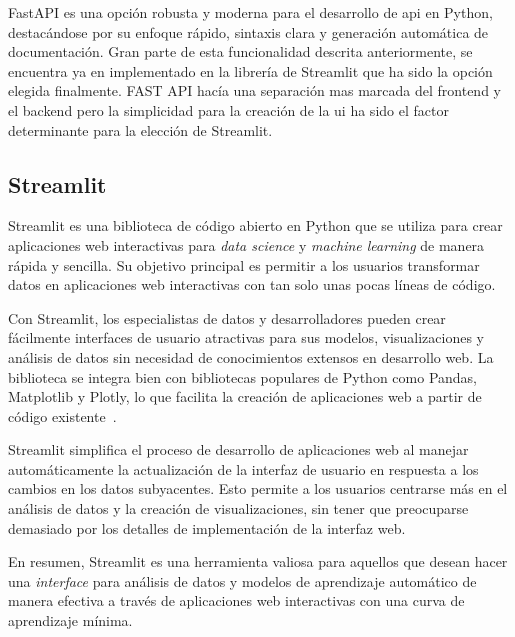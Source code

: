 FastAPI es una opción robusta y moderna para el desarrollo de \acrshort{api} en Python, destacándose por su enfoque rápido, sintaxis clara y generación automática de documentación. Gran parte de esta funcionalidad descrita anteriormente, se encuentra ya en implementado en la librería de Streamlit que ha sido la opción elegida finalmente. FAST API hacía una separación mas marcada del frontend y el backend pero la simplicidad para la creación de la \acrshort{ui} ha sido el factor determinante para la elección de Streamlit.

\subsection{Streamlit}

Streamlit es una biblioteca de código abierto en Python que se utiliza para crear aplicaciones web interactivas para \textit{data science} y \textit{machine learning} de manera rápida y sencilla. Su objetivo principal es permitir a los usuarios transformar datos en aplicaciones web interactivas con tan solo unas pocas líneas de código.

Con Streamlit, los especialistas de datos y desarrolladores pueden crear fácilmente interfaces de usuario atractivas para sus modelos, visualizaciones y análisis de datos sin necesidad de conocimientos extensos en desarrollo web. La biblioteca se integra bien con bibliotecas populares de Python como Pandas, Matplotlib y Plotly, lo que facilita la creación de aplicaciones web a partir de código existente~\cite{Streamlit}.

Streamlit simplifica el proceso de desarrollo de aplicaciones web al manejar automáticamente la actualización de la interfaz de usuario en respuesta a los cambios en los datos subyacentes. Esto permite a los usuarios centrarse más en el análisis de datos y la creación de visualizaciones, sin tener que preocuparse demasiado por los detalles de implementación de la interfaz web.

En resumen, Streamlit es una herramienta valiosa para aquellos que desean hacer una \textit{interface} para análisis de datos y modelos de aprendizaje automático de manera efectiva a través de aplicaciones web interactivas con una curva de aprendizaje mínima.